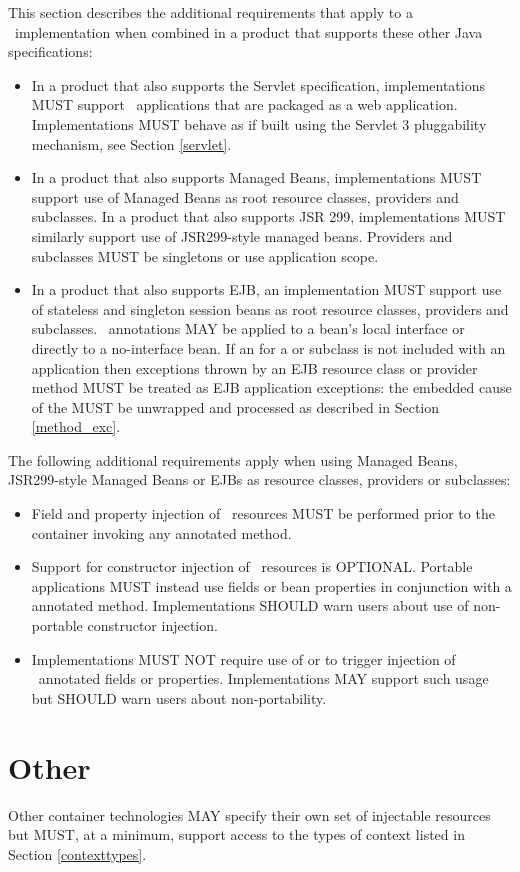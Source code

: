This section describes the additional requirements that apply to a \jaxrs\ implementation when combined in a product that supports these other Java specifications:

\begin{itemize}
\item In a product that also supports the Servlet specification, implementations MUST support \jaxrs\ applications that are packaged as a web application. Implementations MUST behave as if built using the Servlet 3 pluggability mechanism, see Section \ref{servlet}.
\item In a product that also supports Managed Beans, implementations MUST support use of Managed Beans as root resource classes, providers and  subclasses. In a product that also supports JSR 299, implementations MUST similarly support use of JSR299-style managed beans. Providers and  subclasses MUST be singletons or use application scope.
\item In a product that also supports EJB, an implementation MUST support use of stateless and singleton session beans as root resource classes, providers and  subclasses. \jaxrs\ annotations MAY be applied to a bean's local interface or directly to a no-interface bean. If an  for a  or subclass is not included with an application then exceptions thrown by an EJB resource class or provider method MUST be treated as EJB application exceptions: the embedded cause of the  MUST be unwrapped and processed as described in Section \ref{method_exc}.
\end{itemize}

The following additional requirements apply when using Managed Beans, JSR299-style Managed Beans or EJBs as resource classes, providers or  subclasses:

\begin{itemize}
\item Field and property injection of \jaxrs\ resources MUST be performed prior to the container invoking any  annotated method.
\item Support for constructor injection of \jaxrs\ resources is OPTIONAL. Portable applications MUST instead use fields or bean properties in conjunction with a  annotated method. Implementations SHOULD warn users about use of non-portable constructor injection.
\item Implementations MUST NOT require use of  or  to trigger injection of \jaxrs\ annotated fields or properties. Implementations MAY support such usage but SHOULD warn users about non-portability.
\end{itemize}

\section{Other}

Other container technologies MAY specify their own set of injectable resources but MUST, at a minimum, support access to the types of context listed in Section \ref{contexttypes}.
